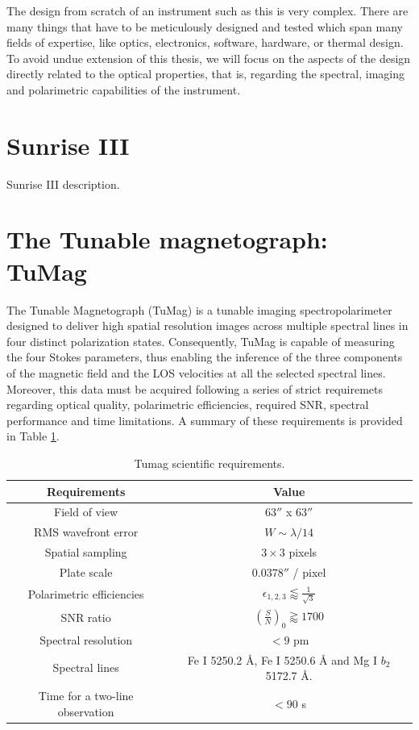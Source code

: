 The design from scratch of an instrument such as this is very complex. There are many things that have to be meticulously designed and tested which span many fields of expertise, like optics, electronics, software, hardware, or thermal design. To avoid undue extension of this thesis, we will focus on the aspects of the design directly related to the optical properties, that is, regarding the spectral, imaging and polarimetric capabilities of the instrument. 

\section{Sunrise III}

Sunrise III description.


\section{The Tunable magnetograph: TuMag}

The Tunable Magnetograph (TuMag) is a tunable imaging spectropolarimeter designed to deliver high spatial resolution images across multiple spectral lines in four distinct polarization states. Consequently, TuMag is capable of measuring the four Stokes parameters, thus enabling the inference of the three components of the magnetic field and the LOS velocities at all the selected spectral lines. Moreover, this data must be acquired following a series of strict requiremets regarding optical quality, polarimetric efficiencies, required SNR, spectral performance and time limitations. A summary of these requirements is provided in Table \ref{table: Tumags requirements}. 

\begin{table}
    \centering
   \begin{tabular}{cc}
    \hline
    \hline
    Requirements & Value \\
    \hline
    Field of view & $63''$ x $63''$ \\
    RMS wavefront error & $W \sim \lambda / 14$\\
    Spatial sampling & $3 \times 3 $ pixels \\
    Plate scale & $0.0378''$ / pixel \\
    Polarimetric efficiencies & $\epsilon _ {1, 2, 3} \lessapprox \frac{1}{\sqrt{3}}$\\
    SNR ratio & $\left(\frac{S}{N}\right) _ 0 \gtrapprox 1700$ \\
    Spectral resolution & $< 9$ pm\\  
    Spectral lines & Fe I 5250.2 \r{A}, Fe I 5250.6 \r{A} and Mg I $b_2$ 5172.7 \r{A}. \\
    Time for a two-line observation & $< 90$ s\\
    \hline
    \hline
    \end{tabular}
    \caption{Tumag scientific requirements.}
    \label{table: Tumags requirements}
\end{table}

